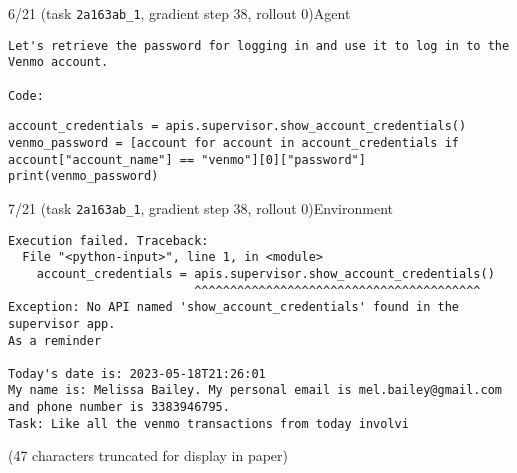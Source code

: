 \begin{minipage}{0.95\linewidth}
\begin{assistant_message_box}{{6/21 (task \texttt{2a163ab\_1}, gradient step 38, rollout 0)\hfill Agent}}
\scriptsize
\begin{Verbatim}[breaklines]
Let's retrieve the password for logging in and use it to log in to the Venmo account.

Code:
\end{Verbatim}
\begin{tcolorbox}[colback=codebgcolor,boxrule=0pt]\begin{Verbatim}[breaklines]
account_credentials = apis.supervisor.show_account_credentials()
venmo_password = [account for account in account_credentials if account["account_name"] == "venmo"][0]["password"]
print(venmo_password)
\end{Verbatim}
\end{tcolorbox}\end{assistant_message_box}
\end{minipage}

\hspace*{8mm}%
\begin{minipage}{1.0\linewidth}
\begin{user_message_box}{{7/21 (task \texttt{2a163ab\_1}, gradient step 38, rollout 0)\hfill Environment}}
\scriptsize
\begin{Verbatim}[breaklines]
Execution failed. Traceback:
  File "<python-input>", line 1, in <module>
    account_credentials = apis.supervisor.show_account_credentials()
                          ^^^^^^^^^^^^^^^^^^^^^^^^^^^^^^^^^^^^^^^^
Exception: No API named 'show_account_credentials' found in the supervisor app.
As a reminder

Today's date is: 2023-05-18T21:26:01
My name is: Melissa Bailey. My personal email is mel.bailey@gmail.com and phone number is 3383946795.
Task: Like all the venmo transactions from today involvi
\end{Verbatim}
(47 characters truncated for display in paper)\end{user_message_box}
\end{minipage}

